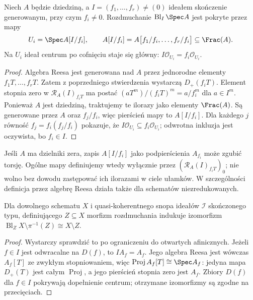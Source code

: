 \begin{stwierdzenie}
\label{st:ga5-blowup-charts}
Niech $A$ będzie dziedziną, a
$I=(f_1,\ldots,f_r)\ne(0)$ ideałem skończenie generowanym,
przy czym $f_i\ne0$. Rozdmuchanie $\operatorname{Bl}_I\Spec A$
jest pokryte przez mapy
\[
 U_i=\Spec A[I/f_i],\qquad
 A[I/f_i]=A\bigl[f_1/f_i,\ldots,f_r/f_i\bigr]\subseteq\Frac(A).
\]
Na $U_i$ ideał centrum po cofnięciu staje się główny:
$I\mathcal O_{U_i}=f_i\mathcal O_{U_i}$.
\end{stwierdzenie}
\begin{proof}
Algebra Reesa jest generowana nad $A$ przez jednorodne
elementy $f_1T,\ldots,f_rT$. Zatem z poprzedniego
stwierdzenia wystarczą $D_+(f_iT)$. Element stopnia
zero w $\mathcal R_A(I)_{f_iT}$ ma postać
$(aT^m)/(f_iT)^m=a/f_i^m$ dla $a\in I^m$.
Ponieważ $A$ jest dziedziną, traktujemy te ilorazy
jako elementy $\Frac(A)$. Są generowane przez $A$
oraz $f_j/f_i$, więc pierścień mapy to $A[I/f_i]$.
Dla każdego $j$ równość $f_j=f_i(f_j/f_i)$ pokazuje,
że $I\mathcal O_{U_i}\subseteq f_i\mathcal O_{U_i}$;
odwrotna inkluzja jest oczywista, bo $f_i\in I$.
\end{proof}

\begin{uwaga}
Jeśli $A$ ma dzielniki zera, zapis $A[I/f_i]$ jako
podpierścienia $A_{f_i}$ może zgubić torsję. Ogólne
mapy definiujemy wtedy wyłącznie przez
$(\mathcal R_A(I)_{f_iT})_0$; nie wolno bez dowodu
zastępować ich ilorazami w ciele ułamków.
W szczególności definicja przez algebrę Reesa działa
także dla schematów niezredukowanych.
\end{uwaga}

\begin{stwierdzenie}
\label{st:ga5-off-centre}
Dla dowolnego schematu $X$ i quasi-koherentnego snopa
ideałów $\mathcal I$ skończonego typu, definiującego $Z\subseteq X$
morfizm rozdmuchania indukuje izomorfizm
$\operatorname{Bl}_Z X\setminus\pi^{-1}(Z)\cong X\setminus Z$.
\end{stwierdzenie}
\begin{proof}
Wystarczy sprawdzić to po ograniczeniu do otwartych
afinicznych. Jeżeli $f\in I$ jest odwracalne na $D(f)$,
to $I A_f=A_f$. Jego algebra Reesa jest wówczas
$A_f[T]$ ze zwykłym stopniowaniem, więc
$\operatorname{Proj}A_f[T]\cong\Spec A_f$: jedyna mapa
$D_+(T)$ jest całym $\operatorname{Proj}$, a jego
pierścień stopnia zero jest $A_f$. Zbiory $D(f)$
dla $f\in I$ pokrywają dopełnienie centrum; otrzymane
izomorfizmy są zgodne na przecięciach.
\end{proof}

